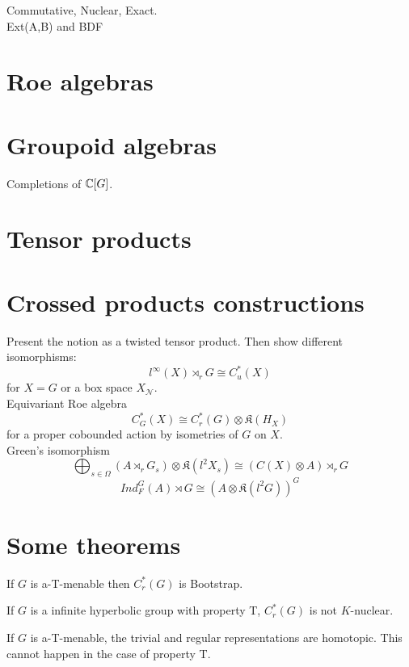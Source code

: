 Commutative, Nuclear, Exact.\\

Ext(A,B) and BDF\\

\section{Roe algebras}

\section{Groupoid algebras}

Completions of $\mathbb C[G]$.

\section{Tensor products}

\section{Crossed products constructions}

Present the notion as a twisted tensor product. Then show different isomorphisms:
\[l^\infty(X)\rtimes_r G \cong C^*_u(X)\]
for $X=G $ or a box space $X_{\mathcal N}$. \\
Equivariant Roe algebra
\[C^*_G(X) \cong C_r^*(G)\otimes \mathfrak K(H_X)\]
for a proper cobounded action by isometries of $G$ on $X$.\\

Green's isomorphism 
\[\bigoplus_{s\in \Omega}(A\rtimes_r G_s) \otimes \mathfrak K(l^2X_s) \cong (C(X)\otimes A )\rtimes_r G\] 
\[Ind_F^G(A)\rtimes G \cong \left( A\otimes \mathfrak K(l^2 G)\right)^G\]

\section{Some theorems}
\begin{thm}
[Tu] If $G$ is a-T-menable then $C^*_r(G)$ is Bootstrap.
\end{thm}

\begin{thm}
If $G$ is a infinite hyperbolic group with property T, $C^*_r(G)$ is not $K$-nuclear.
\end{thm}

If $G$ is a-T-menable, the trivial and regular representations are homotopic. This cannot happen in the case of property T.\\


